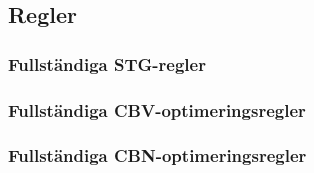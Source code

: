 \documentclass[Rapport]{subfiles}
\begin{document}
\subsection{Regler}


\subsubsection{Fullständiga STG-regler}

\subsubsection{Fullständiga CBV-optimeringsregler}

\subsubsection{Fullständiga CBN-optimeringsregler}
\end{document}

